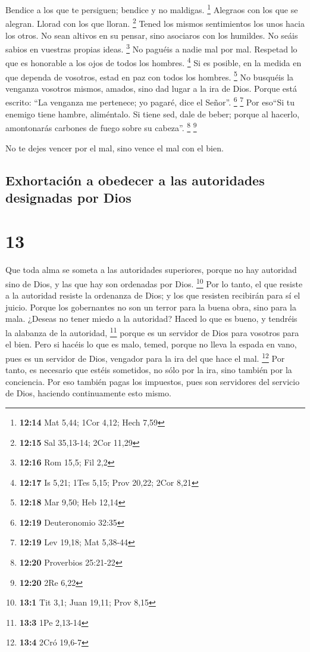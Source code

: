  Bendice a los que te persiguen; bendice y no maldigas.
\footnote{\textbf{12:14} Mat 5,44; 1Cor 4,12; Hech 7,59} 
Alegraos con los que se alegran. Llorad con los que lloran. \footnote{\textbf{12:15}
  Sal 35,13-14; 2Cor 11,29}  Tened los mismos
sentimientos los unos hacia los otros. No sean altivos en su pensar,
sino asociaros con los humildes. No seáis sabios en vuestras propias
ideas. \footnote{\textbf{12:16} Rom 15,5; Fil 2,2}  No
paguéis a nadie mal por mal. Respetad lo que es honorable a los ojos de
todos los hombres. \footnote{\textbf{12:17} Is 5,21; 1Tes 5,15; Prov
  20,22; 2Cor 8,21}  Si es posible, en la medida en que
dependa de vosotros, estad en paz con todos los hombres. \footnote{\textbf{12:18}
  Mar 9,50; Heb 12,14}  No busquéis la venganza vosotros
mismos, amados, sino dad lugar a la ira de Dios. Porque está escrito:
``La venganza me pertenece; yo pagaré, dice el Señor''. \footnote{\textbf{12:19}
  Deuteronomio 32:35} \footnote{\textbf{12:19} Lev 19,18; Mat 5,38-44}
 Por eso``Si tu enemigo tiene hambre, aliméntalo. Si
tiene sed, dale de beber; porque al hacerlo, amontonarás carbones de
fuego sobre su cabeza''. \footnote{\textbf{12:20} Proverbios 25:21-22}
\footnote{\textbf{12:20} 2Re 6,22}

 No te dejes vencer por el mal, sino vence el mal con el
bien.

\hypertarget{exhortaciuxf3n-a-obedecer-a-las-autoridades-designadas-por-dios}{%
\subsection{Exhortación a obedecer a las autoridades designadas por
Dios}\label{exhortaciuxf3n-a-obedecer-a-las-autoridades-designadas-por-dios}}

\hypertarget{section-12}{%
\section{13}\label{section-12}}

 Que toda alma se someta a las autoridades superiores,
porque no hay autoridad sino de Dios, y las que hay son ordenadas por
Dios. \footnote{\textbf{13:1} Tit 3,1; Juan 19,11; Prov 8,15}
 Por lo tanto, el que resiste a la autoridad resiste la
ordenanza de Dios; y los que resisten recibirán para sí el juicio.
 Porque los gobernantes no son un terror para la buena
obra, sino para la mala. ¿Deseas no tener miedo a la autoridad? Haced lo
que es bueno, y tendréis la alabanza de la autoridad, \footnote{\textbf{13:3}
  1Pe 2,13-14}  porque es un servidor de Dios para
vosotros para el bien. Pero si hacéis lo que es malo, temed, porque no
lleva la espada en vano, pues es un servidor de Dios, vengador para la
ira del que hace el mal. \footnote{\textbf{13:4} 2Cró 19,6-7}
 Por tanto, es necesario que estéis sometidos, no sólo por
la ira, sino también por la conciencia.  Por eso también
pagas los impuestos, pues son servidores del servicio de Dios, haciendo
continuamente esto mismo.

